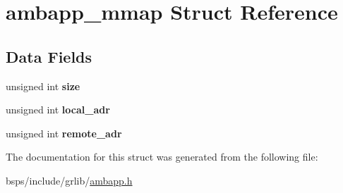 \hypertarget{structambapp__mmap}{}\section{ambapp\+\_\+mmap Struct Reference}
\label{structambapp__mmap}
\subsection*{Data Fields}
\begin{DoxyCompactItemize}
\item 
\mbox{\label{structambapp__mmap_a359b4d012eb6438e715e90cea7c75d97}} 
unsigned int {\bfseries size}
\item 
\mbox{\label{structambapp__mmap_a0b261f1d34954f37eb7132a0103cac6f}} 
unsigned int {\bfseries local\+\_\+adr}
\item 
\mbox{\label{structambapp__mmap_afcca5c83c41e3585ff6a53b05987a087}} 
unsigned int {\bfseries remote\+\_\+adr}
\end{DoxyCompactItemize}


The documentation for this struct was generated from the following file\+:\begin{DoxyCompactItemize}
\item 
bsps/include/grlib/\mbox{\hyperlink{ambapp_8h}{ambapp.\+h}}\end{DoxyCompactItemize}
